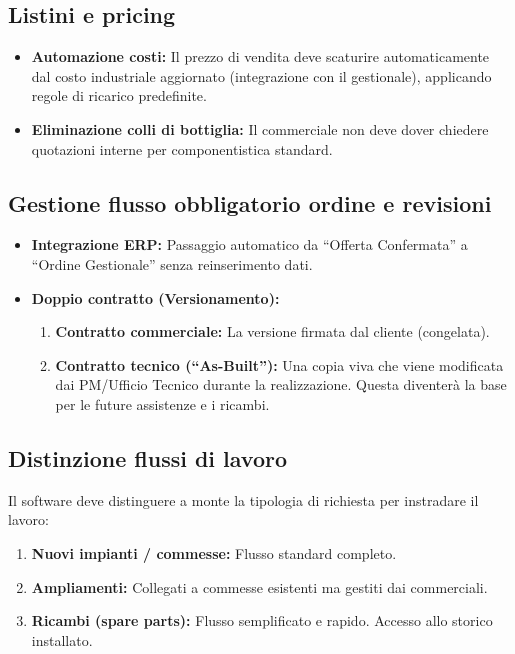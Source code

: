 \subsection{Listini e pricing}
\begin{itemize}
      \item \textbf{Automazione costi:} Il prezzo di vendita deve scaturire automaticamente dal costo industriale
            aggiornato (integrazione con il gestionale), applicando regole di ricarico predefinite.
      \item \textbf{Eliminazione colli di bottiglia:} Il commerciale non deve dover chiedere quotazioni interne per
            componentistica standard.
\end{itemize}

\subsection{Gestione flusso obbligatorio ordine e revisioni}
\begin{itemize}
      \item \textbf{Integrazione ERP:} Passaggio automatico da ``Offerta Confermata''
            a ``Ordine Gestionale'' senza reinserimento dati.
      \item \textbf{Doppio contratto (Versionamento):}
            \begin{enumerate}
                  \item \textbf{Contratto commerciale:} La versione firmata dal cliente (congelata).
                  \item \textbf{Contratto tecnico (``As-Built''):} Una copia viva che viene modificata dai
                        PM/Ufficio Tecnico durante la realizzazione.
                        Questa diventerà la base per le future assistenze e i ricambi.
            \end{enumerate}
\end{itemize}

\subsection{Distinzione flussi di lavoro}
Il software deve distinguere a monte la tipologia di richiesta per instradare
il lavoro:
\begin{enumerate}
      \item \textbf{Nuovi impianti / commesse:} Flusso standard completo.
      \item \textbf{Ampliamenti:} Collegati a commesse esistenti ma gestiti dai commerciali.
      \item \textbf{Ricambi (spare parts):} Flusso semplificato e rapido. Accesso allo storico installato.
\end{enumerate}

